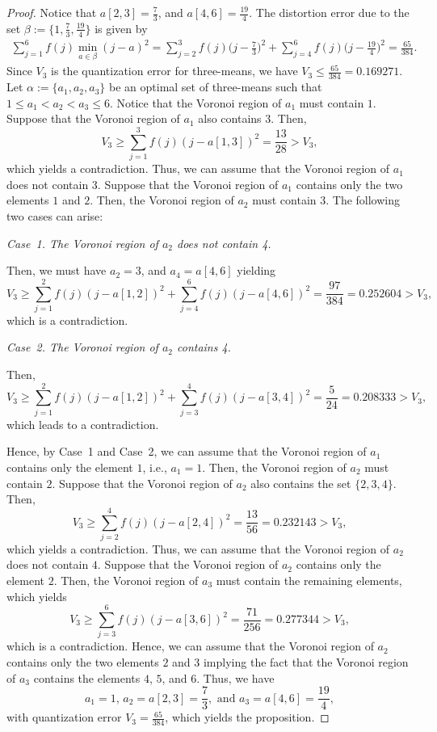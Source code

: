 \documentclass[12pt, reqno]{amsart}
\theoremstyle{plain}
\theoremstyle{definition}
\newcommand{\set}[1]{\{#1\}}%
\newcommand{\ga}{\alpha}
\newcommand{\gb}{\beta}
\newcommand{\tit}{\textit}%
\newcommand{\te}{\text}%
\begin{document}
\begin{proof}
Notice that $a[2,3]=\frac 73$, and $a[4,6]=\frac{19} 4$.
The distortion error due to the set $\gb:=\set{1, \frac 73, \frac {19} 4}$ is given by
\begin{align*}\sum_{j=1}^6 f(j)\min_{a\in \gb} (j-a)^2=\sum _{j=2}^3 f(j)\Big(j-\frac{7}{3}\Big)^2+\sum _{j=4}^6f(j)\Big(j-\frac{19}{4}\Big)^2=\frac{65}{384}.
\end{align*}
Since $V_3$ is the quantization error for three-means, we have $V_3\leq \frac{65}{384}=0.169271$. Let $\ga:=\set{a_1, a_2, a_3}$ be an optimal set of three-means such that $1\leq a_1<a_2<a_3\leq 6$. Notice that the Voronoi region of $a_1$ must contain $1$. Suppose that the Voronoi region of $a_1$ also contains $3$. Then,
\[V_3\geq \sum_{j=1}^3 f(j)(j-a[1,3])^2 =\frac{13}{28}>V_3,\]
which yields a contradiction. Thus, we can assume that the Voronoi region of $a_1$ does not contain $3$. Suppose that the Voronoi region of $a_1$ contains only the two elements $1$ and $2$. Then, the Voronoi region of $a_2$ must contain $3$. The following two cases can arise:

\tit{Case~1. The Voronoi region of $a_2$ does not contain 4.}

Then, we must have $a_2=3$, and $a_4=a[4, 6]$ yielding
\[V_3\geq \sum_{j=1}^2 f(j) (j-a[1,2])^2 +\sum_{j=4}^6 f(j)(j-a[4,6])^2 =\frac{97}{384}=0.252604>V_3,\]
which is a contradiction.

\tit{Case~2. The Voronoi region of $a_2$ contains 4.}

Then, \[V_3\geq  \sum_{j=1}^2 f(j) (j-a[1,2])^2 +\sum_{j=3}^4 f(j)(j-a[3,4])^2 =\frac 5 {24} =0.208333>V_3,\]
which leads to a contradiction.

Hence, by Case~1 and Case~2, we can assume that the Voronoi region of $a_1$ contains only the element $1$, i.e., $a_1=1$. Then, the Voronoi region of $a_2$ must contain $2$. Suppose that the Voronoi region of $a_2$ also contains the set $\set{2,3,4}$. Then,
\[V_3\geq \sum_{j=2}^4 f(j)(j-a[2,4])^2 =\frac{13}{56}=0.232143>V_3,\]
which yields a contradiction. Thus, we can assume that the Voronoi region of $a_2$ does not contain $4$. Suppose that the Voronoi region of $a_2$ contains only the element $2$. Then, the Voronoi region of $a_3$ must contain the remaining elements, which yields
\[V_3\geq  \sum_{j=3}^6 f(j)(j-a[3,6])^2 =\frac{71}{256}=0.277344>V_3,\]
which is a contradiction. Hence, we can assume that the Voronoi region of $a_2$ contains only the two elements $2$ and $3$ implying the fact that the Voronoi region of $a_3$ contains the elements $4$, $5$, and $6$. Thus, we have
\[a_1=1, \, a_2=a[2,3]=\frac 73, \te{ and } a_3=a[4,6]=\frac {19}4,\]
with quantization error $V_3=\frac{65}{384}$, which yields the proposition.
\end{proof}
\end{document}
